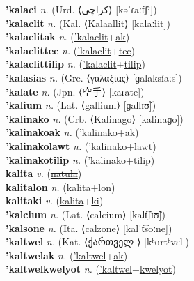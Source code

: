 \textbf{'kalaci} \textit{n.} (Urd. ⟨کراچی‎⟩ [kəˈɾaːt͡ʃi])
 \label{'kalaci} \\
\textbf{'kalaclit} \textit{n.} (Kal. ⟨Kalaallit⟩ [kalaːɬit])
 \label{'kalaclit} \\
\textbf{'kalaclitak} \textit{n.} (\hyperref['kalaclit]{'kalaclit}+\hyperref[ak]{ak})
 \label{'kalaclitak} \\
\textbf{'kalaclittec} \textit{n.} (\hyperref['kalaclit]{'kalaclit}+\hyperref[tec]{tec})
 \label{'kalaclittec} \\
\textbf{'kalaclittilip} \textit{n.} (\hyperref['kalaclit]{'kalaclit}+\hyperref[tilip]{tilip})
 \label{'kalaclittilip} \\
\textbf{'kalasias} \textit{n.} (Gre. ⟨γαλαξίας⟩ [ɡalaksíaːs])
 \label{'kalasias} \\
\textbf{'kalate} \textit{n.} (Jpn. ⟨空手⟩ [kaɾate])
 \label{'kalate} \\
\textbf{'kalium} \textit{n.} (Lat. ⟨gallium⟩ [ɡallɪʊ̃])
 \label{'kalium} \\
\textbf{'kalinako} \textit{n.} (Crb. ⟨Kalinago⟩ [kalinaɡo])
 \label{'kalinako} \\
\textbf{'kalinakoak} \textit{n.} (\hyperref['kalinako]{'kalinako}+\hyperref[ak]{ak})
 \label{'kalinakoak} \\
\textbf{'kalinakolawt} \textit{n.} (\hyperref['kalinako]{'kalinako}+\hyperref[lawt]{lawt})
 \label{'kalinakolawt} \\
\textbf{'kalinakotilip} \textit{n.} (\hyperref['kalinako]{'kalinako}+\hyperref[tilip]{tilip})
 \label{'kalinakotilip} \\
\textbf{kalita} \textit{v.} (\hyperref[natula]{\sout{natula}})
 \label{kalita} \\
\textbf{kalitalon} \textit{n.} (\hyperref[kalita]{kalita}+\hyperref[lon]{lon})
 \label{kalitalon} \\
\textbf{kalitaki} \textit{v.} (\hyperref[kalita]{kalita}+\hyperref[ki]{ki})
 \label{kalitaki} \\
\textbf{'kalcium} \textit{n.} (Lat. ⟨calcium⟩ [kalt͡ʃɪʊ̃])
 \label{'kalcium} \\
\textbf{'kalsone} \textit{n.} (Ita. ⟨calzone⟩ [kalˈt͡soːne])
 \label{'kalsone} \\
\textbf{'kaltwel} \textit{n.} (Kat. ⟨ქართველ-⟩ [kʰɑrtʰvɛl])
 \label{'kaltwel} \\
\textbf{'kaltwelak} \textit{n.} (\hyperref['kaltwel]{'kaltwel}+\hyperref[ak]{ak})
 \label{'kaltwelak} \\
\textbf{'kaltwelkwelyot} \textit{n.} (\hyperref['kaltwel]{'kaltwel}+\hyperref[kwelyot]{kwelyot})
